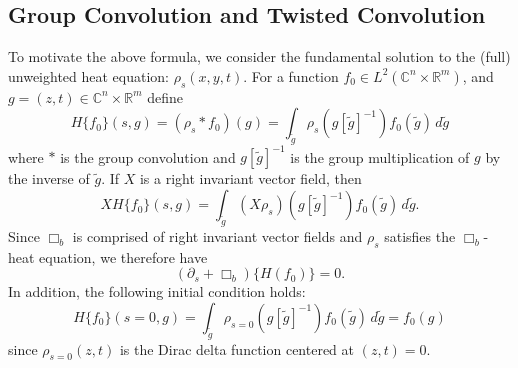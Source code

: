 \documentclass[12pt,reqno]{amsart}
\theoremstyle{definition}
\begin{document}
\subsection{Group Convolution and Twisted Convolution}
To motivate the above formula,  we consider the fundamental solution
to the (full) unweighted heat equation: $\rho_s (x,y,t)$. For 
a function $f_0 \in L^2 ({\mathbb{C}}^n \times {\mathbb{R}}^m)$, and $g=(z,t) \in {\mathbb{C}}^n \times {\mathbb{R}}^m$ define
\begin{equation}
\label{heatker}
H\{f_0\} (s,g)= (\rho_s* f_0)(g) = \int_{\tilde g}  \rho_s (g[\tilde g]^{-1}) f_0(\tilde g) \, d\tilde g
\end{equation}
where $*$ is the group convolution and $g[\tilde g]^{-1}$ is the group multiplication
of $g$ by the inverse of $\tilde g$. If $X$ is a right invariant vector field,
then 
\[
XH\{f_0\}(s, g)  = \int_{\tilde g}  (X\rho_s) (g[\tilde g]^{-1}) f_0(\tilde g) \, d\tilde g.
\]
Since $\Box_b$ is comprised of right invariant vector fields and 
$\rho_s$ satisfies the $\Box_b$-heat equation, we therefore have
\[
({\partial}_s +\Box_b)\{H(f_0)\} =0.
\]
In addition, the following initial condition holds:
\[
H\{f_0\}(s=0,g) = \int_{\tilde g}  \rho_{s=0} (g[\tilde g]^{-1})f_0(\tilde g) \, d\tilde g =
f_0(g) 
\]
since $\rho_{s=0} (z,t)$ is the Dirac delta function centered at $(z,t)=0$.
\end{document}
